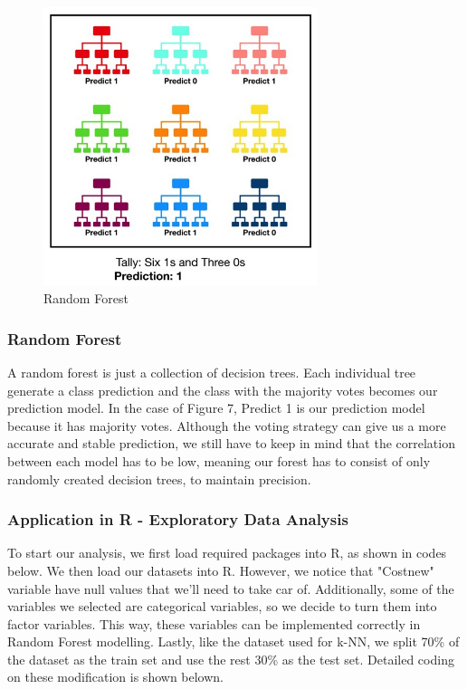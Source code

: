 \documentclass[12pt]{article} %
\theoremstyle{definition}
\begin{document}
\begin{figure}[H]
    \centering
    \includegraphics[width=8cm]{RandomForest/randomForest.png}
    \caption{Random Forest}
    \label{fig:my_label}
\end{figure}

\subsubsection{Random Forest}
A random forest is just a collection of decision trees. Each individual tree generate a class prediction and the class with the majority votes becomes our prediction model. In the case of Figure 7, Predict 1 is our prediction model because it has majority votes. Although the voting strategy can give us a more accurate and stable prediction, we still have to keep in mind that the correlation between each model has to be low, meaning our forest has to consist of only randomly created decision trees, to maintain precision.

\subsubsection{Application in R - Exploratory Data Analysis}
To start our analysis, we first load required packages into R, as shown in codes below. We then load our datasets into R. However, we notice that "Costnew" variable have null values that we'll need to take car of. Additionally, some of the variables we selected are categorical variables, so we decide to turn them into factor variables. This way, these variables can be implemented correctly in Random Forest modelling. Lastly, like the dataset used for k-NN, we split 70\% of the dataset as the train set and use the rest 30\% as the test set. Detailed coding on these modification is shown belown.
\end{document}
